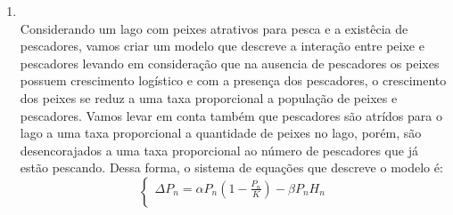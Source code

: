 \documentclass[a4paper]{article}
\begin{document}
\begin{enumerate}
$K$ \'e a capacidade de suporte do meio;\\
$M$ \'e a quantidade de indiv\'iduos que morrem por causas naturais (velhice, doen\c{c}a, cat\'astrofes, etc.).\\
\\
Os coeficientes $\alpha_1, \beta_1, \gamma_1$ representam a taxa de natalidade da esp\'ecie.\\
O efeito produzido pelo aparecimento de uma outra esp\'ecie, competi\c{c}\~ao inter-espec\'ifica, \'e proporcional ao produto dos termos das esp\'ecies multiplicado pelo fator de decrescimento da esp\'ecia presa. Neste modelo, estou supondo que o decrescimento ($\alpha_2, \beta_2, \gamma_2 $) n\~ao muda mesmo mudando a esp\'ecie predadora.\\
O coeficiente $\frac{P ^2}{K}$, onde $P$ \'e uma popula\c{c}\~ao qualquer, mede o efeito do crescimento de uma popula\c{c}\~ao pelo acr\'escimo de um novo indiv\'iduo.\\
Uma observa\c{c}\~ao relevante para a simula\c{c}\~ao do modelo \'e o valor dado aos coeficientes $\alpha$, $\beta$ e $\gamma$, pois cada esp\'ecie pode ter a capacidade de excluir a outra.\\
No caso de n\~ao existirem predadores, as presas crescem at\'e se estabilizarem devido a capacidade de suporte.\\
A popula\c{c}\~ao dos predadores diminuem na aus\^encia de presas.\\
\item
\\
Considerando um lago com peixes atrativos para pesca e a exist\^ecia de pescadores, vamos criar um modelo que descreve a intera\c{c}\~ao entre peixe e pescadores levando em considera\c{c}\~ao que na ausencia de pescadores os peixes possuem crescimento log\'istico e com a presen\c{c}a dos pescadores, o crescimento dos peixes se reduz a uma taxa proporcional a popula\c{c}\~ao de peixes e pescadores. Vamos levar em conta tamb\'em que pescadores s\~ao atr\'idos para o lago a uma taxa proporcional a quantidade de peixes no lago, por\'em, s\~ao desencorajados a uma taxa proporcional ao n\'umero de pescadores  que j\'a est\~ao pescando. Dessa forma, o sistema de equa\c{c}\~oes que descreve o modelo \'e:
\begin{equation}
\left\{\begin{array}{l}
\Delta P_n = \alpha P_n (1 - \frac{ P_n}{K})  - \beta P_n H_n\\

\end{array}
\end{equation}
\end{enumerate}
\end{document}
